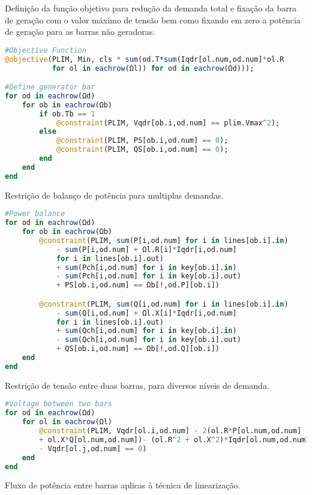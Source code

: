 Definição da função objetivo para redução da demanda total e fixação da barra de geração com o valor máximo de tensão bem como fixando em zero a potência de geração para as barras não geradoras.

\begin{lstlisting}[language = Julia, firstnumber = 46]
#Objective Function
@objective(PLIM, Min, cls * sum(od.T*sum(Iqdr[ol.num,od.num]*ol.R 
           for ol in eachrow(Ωl)) for od in eachrow(Ωd)));

#Define generator bar  
for od in eachrow(Ωd)    
    for ob in eachrow(Ωb)
        if ob.Tb == 1
            @constraint(PLIM, Vqdr[ob.i,od.num] == plim.Vmax^2);
        else
            @constraint(PLIM, PS[ob.i,od.num] == 0);
            @constraint(PLIM, QS[ob.i,od.num] == 0);
        end
    end
end
\end{lstlisting}

Restrição de balanço de potência para multiplas demandas.

\begin{lstlisting}[language = Julia, firstnumber = 61]
#Power balance
for od in eachrow(Ωd)    
    for ob in eachrow(Ωb)
        @constraint(PLIM, sum(P[i,od.num] for i in lines[ob.i].in) 
            - sum(P[i,od.num] + Ωl.R[i]*Iqdr[i,od.num] 
            for i in lines[ob.i].out)
            + sum(Pch[i,od.num] for i in key[ob.i].in)
            - sum(Pch[i,od.num] for i in key[ob.i].out)
            + PS[ob.i,od.num] == Ωb[!,od.P][ob.i])

        @constraint(PLIM, sum(Q[i,od.num] for i in lines[ob.i].in) 
            - sum(Q[i,od.num] + Ωl.X[i]*Iqdr[i,od.num] 
            for i in lines[ob.i].out)
            + sum(Qch[i,od.num] for i in key[ob.i].in)
            - sum(Qch[i,od.num] for i in key[ob.i].out)
            + QS[ob.i,od.num] == Ωb[!,od.Q][ob.i])
    end
end
\end{lstlisting}

Restrição de tensão entre duas barras, para diversos níveis de demanda.

\begin{lstlisting}[language = Julia, firstnumber = 77]
#Voltage between two bars
for od in eachrow(Ωd)
    for ol in eachrow(Ωl)
        @constraint(PLIM, Vqdr[ol.i,od.num] - 2(ol.R*P[ol.num,od.num] 
        + ol.X*Q[ol.num,od.num])- (ol.R^2 + ol.X^2)*Iqdr[ol.num,od.num]
        - Vqdr[ol.j,od.num] == 0)
    end
end
\end{lstlisting}

Fluxo de potência entre barras aplicas à técnica de linearização.

